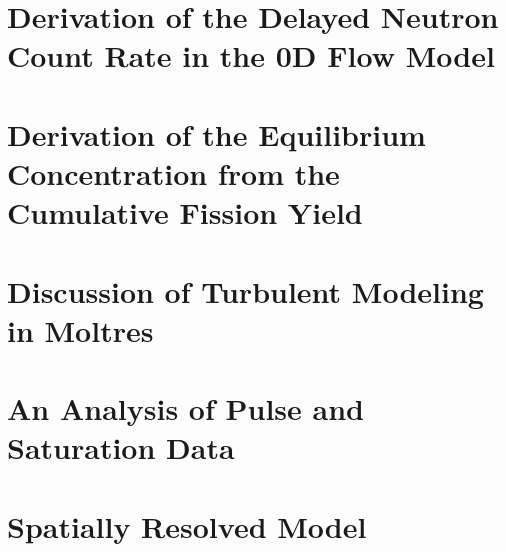 \chapter{Derivation of the Delayed Neutron Count Rate in the 0D Flow Model}


\chapter{Derivation of the Equilibrium Concentration from the Cumulative Fission Yield}


\chapter{Discussion of Turbulent Modeling in Moltres}


\chapter{An Analysis of Pulse and Saturation Data}


\chapter{Spatially Resolved Model}
